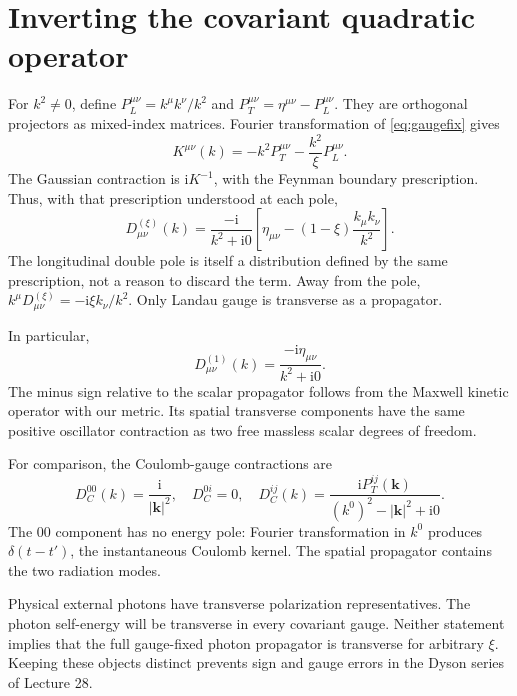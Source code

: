 \documentclass[11pt]{article}
\newcommand{\ii}{\mathrm i}
\newcommand{\module}[1]{\clearpage\section{#1}}
\begin{document}
\module{Inverting the covariant quadratic operator}
For \(k^2\ne0\), define
\(P_L^{\mu\nu}=k^\mu k^\nu/k^2\) and
\(P_T^{\mu\nu}=\eta^{\mu\nu}-P_L^{\mu\nu}\).
They are orthogonal projectors as mixed-index matrices. Fourier
transformation of \eqref{eq:gaugefix} gives
\begin{equation}
 K^{\mu\nu}(k)=-k^2P_T^{\mu\nu}-\frac{k^2}{\xi}P_L^{\mu\nu}.
\end{equation}
The Gaussian contraction is \(\ii K^{-1}\), with the Feynman boundary
prescription. Thus, with that prescription understood at each pole,
\begin{equation}
 D_{\mu\nu}^{(\xi)}(k)
 =\frac{-\ii}{k^2+\ii0}
 \left[\eta_{\mu\nu}-(1-\xi)\frac{k_\mu k_\nu}{k^2}\right].
 \label{eq:photonprop}
\end{equation}
The longitudinal double pole is itself a distribution defined by the
same prescription, not a reason to discard the term. Away from the pole,
\(k^\mu D_{\mu\nu}^{(\xi)}=-\ii\xi k_\nu/k^2\).
Only Landau gauge is transverse as a propagator.

In particular,
\begin{equation}
 D_{\mu\nu}^{(1)}(k)=\frac{-\ii\eta_{\mu\nu}}{k^2+\ii0}.
\end{equation}
The minus sign relative to the scalar propagator follows from the
Maxwell kinetic operator with our metric. Its spatial transverse
components have the same positive oscillator contraction as two free
massless scalar degrees of freedom.

For comparison, the Coulomb-gauge contractions are
\begin{equation}
 D_C^{00}(k)=\frac{\ii}{|\bm k|^2},\quad D_C^{0i}=0,\quad
 D_C^{ij}(k)=\frac{\ii P_T^{ij}(\bm k)}{(k^0)^2-|\bm k|^2+\ii0}.
 \label{eq:coulombprop}
\end{equation}
The \(00\) component has no energy pole: Fourier transformation in
\(k^0\) produces \(\delta(t-t')\), the instantaneous Coulomb kernel.
The spatial propagator contains the two radiation modes.

\begin{remarkbox}
Physical external photons have transverse polarization representatives.
The photon self-energy will be transverse in every covariant gauge.
Neither statement implies that the full gauge-fixed photon propagator is
transverse for arbitrary \(\xi\). Keeping these objects distinct prevents
sign and gauge errors in the Dyson series of Lecture 28.
\end{remarkbox}
\end{document}
